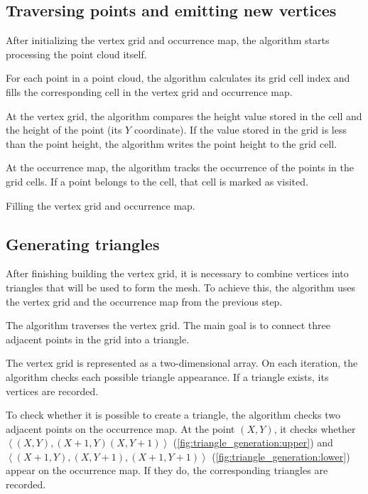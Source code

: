 \subsection{Traversing points and emitting new vertices}

After initializing the vertex grid and occurrence map, the algorithm starts processing the point cloud itself.

For each point in a point cloud, the algorithm  calculates its grid cell index and fills the corresponding cell in the vertex grid and occurrence map.

At the vertex grid, the algorithm compares the height value stored in the cell and the height of the point (its $Y$ coordinate). If the value stored in the grid is less than the point height, the algorithm writes the point height to the grid cell.

At the occurrence map, the algorithm tracks the occurrence of the points in the grid cells. If a point belongs to the cell, that cell is marked as visited.


\begin{algorithm}
    \caption{Filling the vertex grid and occurrence map.}

\end{algorithm}


\subsection{Generating triangles}

After finishing building the vertex grid, it is necessary to combine vertices into triangles that will be used to form the mesh. To achieve this, the algorithm uses the vertex grid and the occurrence map from the previous step.

The algorithm traverses the vertex grid. The main goal is to connect three adjacent points in the grid into a triangle.

The vertex grid is represented as a two-dimensional array. On each iteration, the algorithm checks each possible triangle appearance. If a triangle exists, its vertices are recorded.

To check whether it is possible to create a triangle, the algorithm checks two adjacent points on the occurrence map. At the point $(X, Y)$, it checks whether $\left \langle (X, Y), (X+1, Y) (X, Y+1) \right \rangle$ (\autoref{fig:triangle_generation:upper}) and $\left \langle (X+1, Y), (X, Y+1), (X+1, Y+1) \right \rangle$ (\autoref{fig:triangle_generation:lower}) appear on the occurrence map. If they do, the corresponding triangles are recorded.

